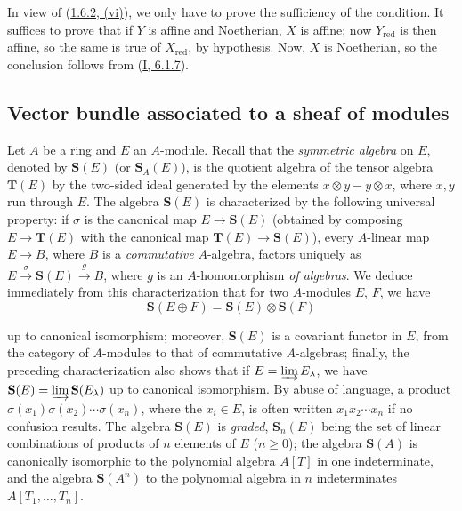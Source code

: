 In view of (\hyperref[II.1.6.2]{1.6.2, (vi)}), we only have to prove the
sufficiency of the condition. It suffices to prove that if $Y$ is affine and
Noetherian, $X$ is affine; now $Y_{\mathrm{red}}$ is then affine, so the same
is true of $X_{\mathrm{red}}$, by hypothesis. Now, $X$ is Noetherian,
so the conclusion follows from (\hyperref[I.6.1.7]{I, 6.1.7}).


\subsection{Vector bundle associated to a sheaf of modules}
\label{II.1.7}

\begin{env}[1.7.1]
\label{II.1.7.1}
Let $A$ be a ring and $E$ an $A$-module. Recall that the \emph{symmetric
algebra} on $E$, denoted by $\mathbf{S}(E)$ (or $\mathbf{S}_A(E)$), is
the quotient algebra of the tensor algebra $\mathbf{T}(E)$ by the two-sided
ideal generated by the elements $x\otimes y-y\otimes x$, where $x,y$
run through $E$. The algebra $\mathbf{S}(E)$ is characterized by the
following universal property: if $\sigma$ is the canonical map
$E\to\mathbf{S}(E)$ (obtained by composing $E\to\mathbf{T}(E)$ with
the canonical map $\mathbf{T}(E)\to\mathbf{S}(E)$), every
$A$-linear map $E\to B$, where $B$ is a \emph{commutative} $A$-algebra,
factors uniquely as
$E\xrightarrow{\sigma}\mathbf{S}(E)\xrightarrow{g}B$, where $g$ is an
$A$-homomorphism \emph{of algebras}. We deduce immediately from this
characterization that for two $A$-modules $E$, $F$, we have
\[
  \mathbf{S}(E\oplus F)=\mathbf{S}(E)\otimes\mathbf{S}(F)
\]

up to canonical isomorphism; moreover, $\mathbf{S}(E)$ is a covariant
functor in $E$, from the category of $A$-modules to that of commutative
$A$-algebras; finally, the preceding characterization also shows that if
$E=\varinjlim E_\lambda$, we have
$\mathbf{S}(E)=\varinjlim\mathbf{S}(E_\lambda)$ up to canonical
isomorphism. By abuse of language, a product
$\sigma(x_1)\sigma(x_2)\cdots\sigma(x_n)$, where the $x_i\in E$, is often
written $x_1x_2\cdots x_n$ if no confusion results. The algebra
$\mathbf{S}(E)$ is \emph{graded}, $\mathbf{S}_n(E)$ being the set of
linear combinations of products of $n$ elements of $E$ ($n\geq 0$);
the algebra $\mathbf{S}(A)$ is canonically isomorphic to the polynomial
algebra $A[T]$ in one indeterminate, and the algebra $\mathbf{S}(A^n)$ to
the polynomial algebra in $n$ indeterminates $A[T_1,\ldots,T_n]$.
\end{env}

